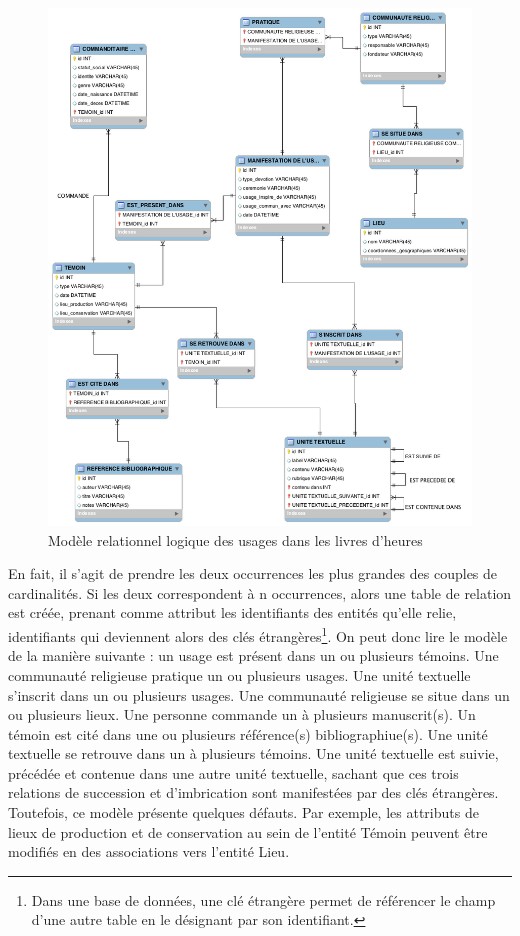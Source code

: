 \documentclass[a4paper,12pt,twoside]{book}
\begin{document}
    \begin{figure}[!h]
    \centering
    \includegraphics[width=15cm]{img/Modelisation/MRD_Usages.png}
    \caption{Modèle relationnel logique des usages dans les livres d'heures}
    \end{figure}
    \clearpage
	
	En fait, il s'agit de prendre les deux occurrences les plus grandes des couples de cardinalités. Si les deux correspondent à \og n\fg{} occurrences, alors une table de relation est créée, prenant comme attribut les identifiants des entités qu'elle relie, identifiants qui deviennent alors des clés étrangères\footnote{Dans une base de données, une clé étrangère permet de référencer le champ d'une autre table en le désignant par son identifiant.}. On peut donc lire le modèle de la manière suivante : un usage est présent dans un ou plusieurs témoins. Une communauté religieuse pratique un ou plusieurs usages. Une unité textuelle s'inscrit dans un ou plusieurs usages. Une communauté religieuse se situe dans un ou plusieurs lieux. Une personne commande un à plusieurs manuscrit(s). Un témoin est cité dans une ou plusieurs référence(s) bibliographiue(s). Une unité textuelle se retrouve dans un à plusieurs témoins. Une unité textuelle est suivie, précédée et contenue dans une autre unité textuelle, sachant que ces trois relations de succession et d'imbrication sont manifestées par des clés étrangères. Toutefois, ce modèle présente quelques défauts. Par exemple, les attributs de lieux de production et de conservation au sein de l’entité \og Témoin\fg{} peuvent être modifiés en des associations vers l’entité \og Lieu\fg{}.\\
	
\end{document}

